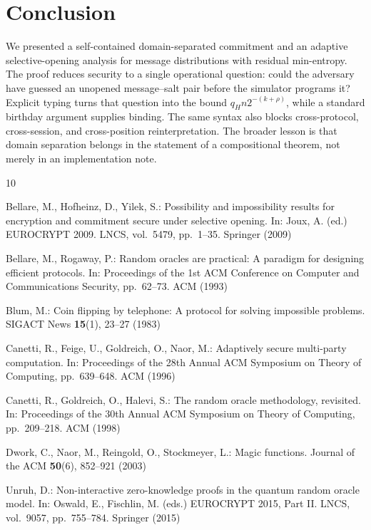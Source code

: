 \section{Conclusion}

We presented a self-contained domain-separated commitment and an adaptive
selective-opening analysis for message distributions with residual
min-entropy.  The proof reduces security to a single operational question:
could the adversary have guessed an unopened message--salt pair before the
simulator programs it?  Explicit typing turns that question into the bound
$q_Hn2^{-(k+\rho)}$, while a standard birthday argument supplies binding.
The same syntax also blocks cross-protocol, cross-session, and cross-position
reinterpretation.  The broader lesson is that domain separation belongs in
the statement of a compositional theorem, not merely in an implementation
note.

\begin{thebibliography}{10}

Bellare, M., Hofheinz, D., Yilek, S.:
Possibility and impossibility results for encryption and commitment secure
under selective opening.
In: Joux, A. (ed.) EUROCRYPT 2009. LNCS, vol.~5479, pp.~1--35.
Springer (2009)

Bellare, M., Rogaway, P.:
Random oracles are practical: A paradigm for designing efficient protocols.
In: Proceedings of the 1st ACM Conference on Computer and Communications
Security, pp.~62--73. ACM (1993)

Blum, M.:
Coin flipping by telephone: A protocol for solving impossible problems.
SIGACT News \textbf{15}(1), 23--27 (1983)

Canetti, R., Feige, U., Goldreich, O., Naor, M.:
Adaptively secure multi-party computation.
In: Proceedings of the 28th Annual ACM Symposium on Theory of Computing,
pp.~639--648. ACM (1996)

Canetti, R., Goldreich, O., Halevi, S.:
The random oracle methodology, revisited.
In: Proceedings of the 30th Annual ACM Symposium on Theory of Computing,
pp.~209--218. ACM (1998)

Dwork, C., Naor, M., Reingold, O., Stockmeyer, L.:
Magic functions.
Journal of the ACM \textbf{50}(6), 852--921 (2003)

Unruh, D.:
Non-interactive zero-knowledge proofs in the quantum random oracle model.
In: Oswald, E., Fischlin, M. (eds.) EUROCRYPT 2015, Part II. LNCS,
vol.~9057, pp.~755--784. Springer (2015)

\end{thebibliography}

\appendix
\renewcommand{\theHsection}{appendix.\Alph{section}}
